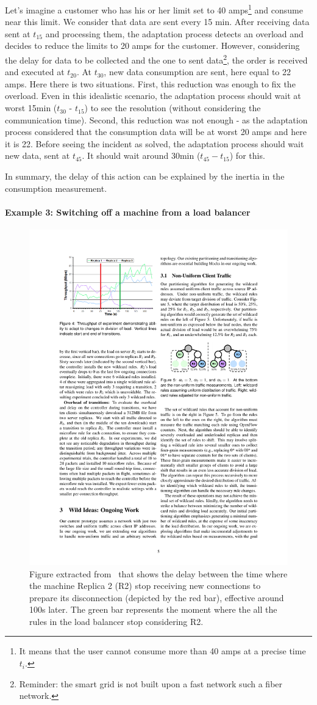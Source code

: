 Let's imagine a customer who has his or her limit set to 40 amps\footnote{It means that the user cannot consume more than 40 amps at a precise time $t_i$.} and consume near this limit.
We consider that data are sent every 15 min.
After receiving data sent at $t_{15}$ and processing them, the adaptation process detects an overload and decides to reduce the limits to 20 amps for the customer.
However, considering the delay for data to be collected and the one to sent data\footnote{Reminder: the smart grid is not built upon a fast network such a fiber network.}, the order is received and executed at $t_{20}$.
At $t_30$, new data consumption are sent, here equal to 22 amps.
Here there is two situations.
First, this reduction was enough to fix the overload.
Even in this idealistic scenario, the adaptation process should wait at worst 15min ($t_{30}$ - $t_{15}$) to see the resolution (without considering the communication time).
Second, this reduction was not enough - as the adaptation process considered that the consumption data will be at worst 20 amps and here it is 22.
Before seeing the incident as solved, the adaptation process should wait new data, sent at $t_{45}$.
It should wait around 30min ($t_{45} - t_{15}$) for this.

In summary, the delay of this action can be explained by the inertia in the consumption measurement.

\paragraph{Example 3: Switching off a machine from a load balancer}
\begin{figure}
	\centering
	\includegraphics[width=0.5\linewidth]{img/chapt-tkm/intro/load-balencer}
	\caption{Figure extracted from~\cite{DBLP:conf/nsdi/WangBR11} that shows the delay between the time where the machine Replica 2 (R2) stop receiving new connections to prepare its disconnection (depicted by the red bar), effective around 100s later. The green bar represents the moment where the all the rules in the load balancer stop considering R2.}
	\label{fig:tkm:intro:example-load-balencer}
	
\end{figure}


